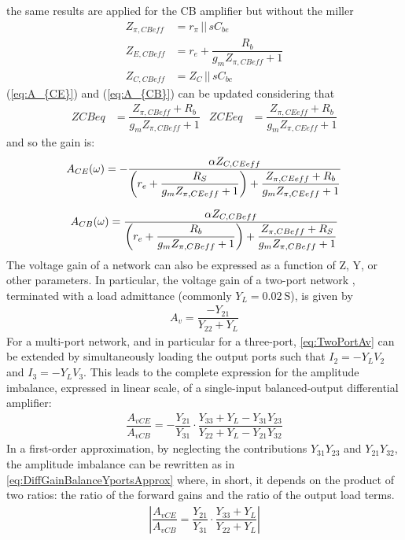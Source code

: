 \noindent
the same results are applied for the CB amplifier but without the miller
\begin{align}
    Z_{\pi,CBeff}&= r_{\pi} \, || \, sC_{be}\\
    Z_{E,CBeff} &= r_e+\dfrac{R_b}{g_m  Z_{\pi,CBeff}+1}\\
    Z_{C,CBeff}  &= Z_C\, || \, sC_{bc}
\end{align}
\noindent
(\ref{eq:A_{CE}}) and (\ref{eq:A_{CB}}) can be updated considering that
\begin{align}
    ZCBeq&=\dfrac{Z_{\pi,CBeff}+R_b}{g_mZ_{\pi,CBeff}+1} & ZCEeq&=\dfrac{Z_{\pi,CEeff}+R_b}{g_mZ_{\pi,CEeff}+1}
\end{align}
and so the gain is:
\begin{equation}
    A_{CE}(\omega)=-\dfrac{\alpha Z_{C,CEeff}}{\left(r_e+\dfrac{R_S}{g_m Z_{\pi,CEeff}+1}\right)+\dfrac{Z_{\pi,CEeff}+R_b}{g_m Z_{\pi,CEeff}+1}}
    \label{eq:A_{CEeff}}
\end{equation}


\begin{equation}
    A_{CB}(\omega)=\dfrac{\alpha Z_{C,CBeff}}{\left(r_e+\dfrac{R_b}{g_m Z_{\pi,CBeff}+1}\right)+\dfrac{Z_{\pi,CBeff}+R_S}{g_m Z_{\pi,CBeff}+1}}
    \label{eq:A_{CBeff}}
\end{equation}
\cleardoublepage
\noindent
 The voltage gain of a network can also be expressed as a function of Z, Y, or other parameters. In particular, the voltage gain of a two-port network \cite{High-Frequency Integrated Circuits}, terminated with a load admittance (commonly $Y_L=\SI{0.02}{\siemens}$), is given by
\begin{align}
    A_v=\dfrac{-Y_{21}}{Y_{22}+Y_L}
    \label{eq:TwoPortAv}
\end{align}
For a multi-port network, and in particular for a three-port, \eqref{eq:TwoPortAv} can be extended by simultaneously loading the output ports such that $I_2=-Y_LV_2$ and $I_3=-Y_LV_3$. This leads to the complete expression for the amplitude imbalance, expressed in linear scale, of a single-input balanced-output differential amplifier:
\begin{align}
    \dfrac{A_{vCE}}{A_{vCB}}=-\dfrac{Y_{21}}{Y_{31}}\cdot\dfrac{Y_{33}+Y_L-Y_{31}Y_{23}}{Y_{22}+Y_L-Y_{21}Y_{32}}
    \label{eq:DiffGainBalanceYportsComplete}
\end{align}
In a first-order approximation, by neglecting the contributions $Y_{31}Y_{23}$ and $Y_{21}Y_{32}$, the amplitude imbalance can be rewritten as in \eqref{eq:DiffGainBalanceYportsApprox} where, in short, it depends on the product of two ratios: the ratio of the forward gains and the ratio of the output load terms.
\begin{align}
    \left| \dfrac{A_{vCE}}{A_{vCB}}=\dfrac{Y_{21}}{Y_{31}}\cdot\dfrac{Y_{33}+Y_L}{Y_{22}+Y_L}\right|
    \label{eq:DiffGainBalanceYportsApprox}
\end{align}

